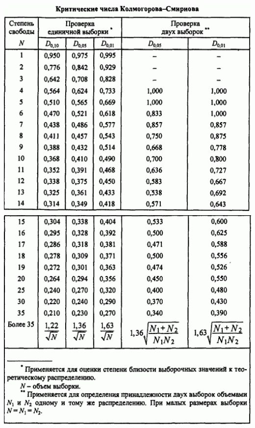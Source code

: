 \documentclass[11pt]{article}
\begin{document}
\includegraphics{d420a8de-3463-4dd9-bced-c23125a05b84.png}
\includegraphics{30bca2d5-ca12-42c4-947f-8d451a69e17b.png}
\end{document}
